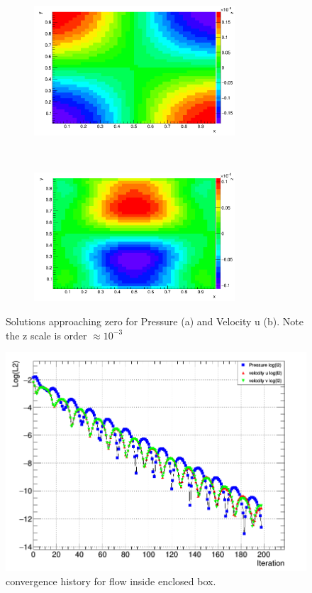 \documentclass[paper=a4, fontsize=11pt, abstract=on]{scrartcl}
\numberwithin{equation}{section}		%
\numberwithin{figure}{section}			%
\numberwithin{table}{section}				%
\begin{document}
\begin{figure}[H]
        \centering
        \begin{subfigure}[h]{0.5\textwidth}
                \includegraphics[width = 7.5cm]{z1}
                \caption{}
				
        \end{subfigure}%
       ~~~~~
        \begin{subfigure}[h]{0.5\textwidth}
                \includegraphics[width = 7.5cm]{z2}
                \caption{}
                
        \end{subfigure}
        \caption{Solutions approaching zero for Pressure (a) and Velocity u (b). Note the z scale is order $\approx 10^{-3}$ }
        \label{zero1}
\end{figure}



\begin{figure}[H]
\centering
\includegraphics[width=0.80\linewidth]{stabord}
\caption{convergence history for flow inside enclosed box. }
\label{con}
\end{figure}
\end{document}
